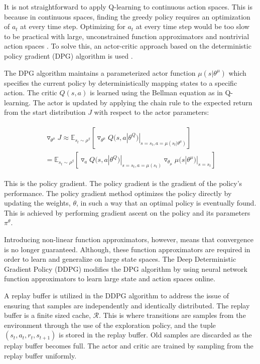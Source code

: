 It is not straightforward to apply Q-learning to continuous action spaces. This is because in continuous spaces, finding the greedy policy requires an optimization of $a_t$ at every time step. Optimizing for $a_t$ at every time step would be too slow to be practical with large, unconstrained function approximators and nontrivial action spaces \cite{Hunt2016}. To solve this, an actor-critic approach based on the deterministic policy gradient (DPG) algorithm is used \cite{Silver2014}.


The DPG algorithm maintains a parameterized actor function $\mu(s|\theta^\mu)$ which specifies the current policy by deterministically mapping states to a specific action. The critic $Q(s,a)$ is learned using the Bellman equation as in Q-learning. The actor is updated by applying the chain rule to the expected return from the start distribution $J$ with respect to the actor parameters:

\begin{align}
\begin{split}
\triangledown_{\theta^\mu}J\approx\mathbb{E}_{s_t\sim\rho^\beta}[\triangledown_{\theta^\mu}Q(s,a|\theta^Q)|_{s=s_t,a=\mu(s_t|\theta^\mu)}] \\
= \mathbb{E}_{s_t\sim\rho^\beta}[\triangledown_aQ(s,a|\theta^Q)|_{s=s_t,a=\mu(s_t)}\triangledown_{\theta_\mu}\mu(s|\theta^\mu)|_{s=s_t}]
\end{split}
\end{align}

This is the policy gradient. The policy gradient is the gradient of the policy's performance. The policy gradient method optimizes the policy directly by updating the weights, $\theta$, in such a way that an optimal policy is eventually found. This is achieved by performing gradient ascent on the policy and its parameters $\pi^\theta$.

Introducing non-linear function approximators, however, means that convergence is no longer guaranteed. Although, these function approximators are required in order to learn and generalize on large state spaces. The Deep Deterministic Gradient Policy (DDPG) modifies the DPG algorithm by using neural network function approximators to learn large state and action spaces online.

A replay buffer is utilized in the DDPG algorithm to address the issue of ensuring that samples are independently and identically distributed. The replay buffer is a finite sized cache, $\mathcal{R}$. This is where transitions are samples from the environment through the use of the exploration policy, and the tuple $(s_t,a_t,r_t,s_{t+1})$ is stored in the replay buffer. Old samples are discarded as the replay buffer becomes full. The actor and critic are trained by sampling from the replay buffer uniformly. 


